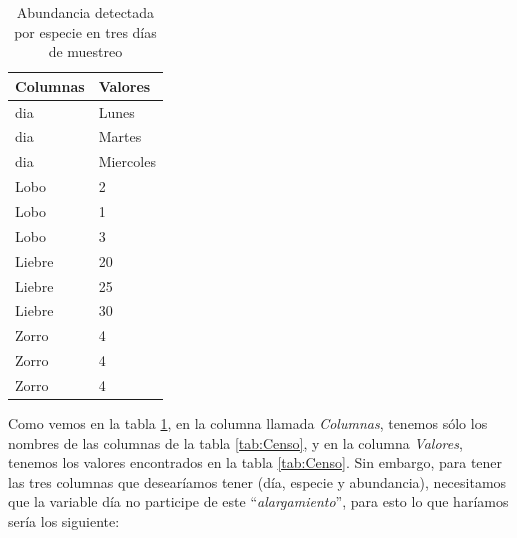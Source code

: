 \documentclass[]{book}
\newenvironment{Shaded}{\begin{snugshade}}{\end{snugshade}}
\newcommand{\DataTypeTok}[1]{\textcolor[rgb]{0.13,0.29,0.53}{#1}}
\newcommand{\KeywordTok}[1]{\textcolor[rgb]{0.13,0.29,0.53}{\textbf{#1}}}
\newcommand{\NormalTok}[1]{#1}
\newcommand{\OperatorTok}[1]{\textcolor[rgb]{0.81,0.36,0.00}{\textbf{#1}}}
\newcommand{\StringTok}[1]{\textcolor[rgb]{0.31,0.60,0.02}{#1}}
\begin{document}
\begin{Shaded}
\end{Shaded}

\begin{table}

\caption{\label{tab:Larga1}Abundancia detectada por especie en tres días de muestreo}
\centering
\begin{tabular}[t]{ll}
\toprule
Columnas & Valores\\
\midrule
dia & Lunes\\
dia & Martes\\
dia & Miercoles\\
Lobo & 2\\
Lobo & 1\\
\addlinespace
Lobo & 3\\
Liebre & 20\\
Liebre & 25\\
Liebre & 30\\
Zorro & 4\\
\addlinespace
Zorro & 4\\
Zorro & 4\\
\bottomrule
\end{tabular}
\end{table}

Como vemos en la tabla \ref{tab:Larga1}, en la columna llamada
\emph{Columnas}, tenemos sólo los nombres de las columnas de la tabla
\ref{tab:Censo}, y en la columna \emph{Valores}, tenemos los valores
encontrados en la tabla \ref{tab:Censo}. Sin embargo, para tener las
tres columnas que desearíamos tener (día, especie y abundancia),
necesitamos que la variable día no participe de este
``\emph{alargamiento}'', para esto lo que haríamos sería los siguiente:

\begin{Shaded}
\end{Shaded}
\end{document}
